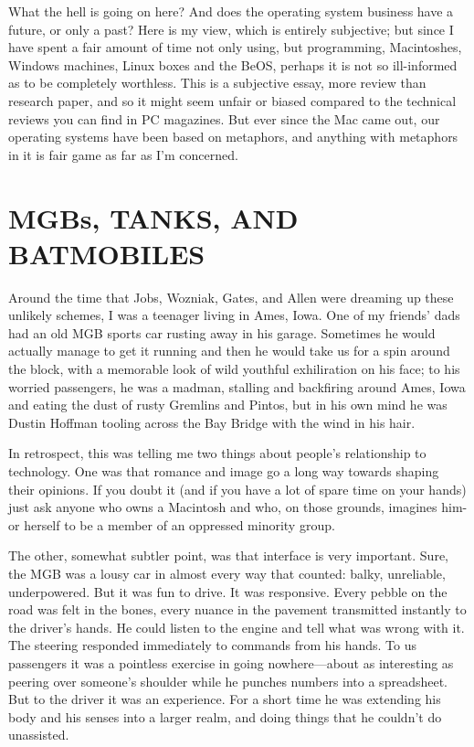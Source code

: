 \documentclass[
  fontsize=11pt,
  paper=landscape,
  twocolumn=true,
  pagesize=pdftex,
  headings=small,
  DIV=15,
  ]{scrartcl}
\begin{document}
What the hell is going on here? And does the operating system business
have a future, or only a past? Here is my view, which is entirely
subjective; but since I have spent a fair amount of time not only using,
but programming, Macintoshes, Windows machines, Linux boxes and the
BeOS, perhaps it is not so ill-informed as to be completely worthless.
This is a subjective essay, more review than research paper, and so it
might seem unfair or biased compared to the technical reviews you can
find in PC magazines. But ever since the Mac came out, our operating
systems have been based on metaphors, and anything with metaphors in it
is fair game as far as I'm concerned.

\section{MGBs, TANKS, AND BATMOBILES}

Around the time that Jobs, Wozniak, Gates, and Allen were dreaming up
these unlikely schemes, I was a teenager living in Ames, Iowa. One of my
friends' dads had an old MGB sports car rusting away in his garage.
Sometimes he would actually manage to get it running and then he would
take us for a spin around the block, with a memorable look of wild
youthful exhiliration on his face; to his worried passengers, he was a
madman, stalling and backfiring around Ames, Iowa and eating the dust of
rusty Gremlins and Pintos, but in his own mind he was Dustin Hoffman
tooling across the Bay Bridge with the wind in his hair.

In retrospect, this was telling me two things about people's
relationship to technology. One was that romance and image go a long way
towards shaping their opinions. If you doubt it (and if you have a lot
of spare time on your hands) just ask anyone who owns a Macintosh and
who, on those grounds, imagines him- or herself to be a member of an
oppressed minority group.

The other, somewhat subtler point, was that interface is very important.
Sure, the MGB was a lousy car in almost every way that counted: balky,
unreliable, underpowered. But it was fun to drive. It was responsive.
Every pebble on the road was felt in the bones, every nuance in the
pavement transmitted instantly to the driver's hands. He could listen to
the engine and tell what was wrong with it. The steering responded
immediately to commands from his hands. To us passengers it was a
pointless exercise in going nowhere---about as interesting as peering
over someone's shoulder while he punches numbers into a spreadsheet. But
to the driver it was an experience. For a short time he was extending
his body and his senses into a larger realm, and doing things that he
couldn't do unassisted.
\end{document}
